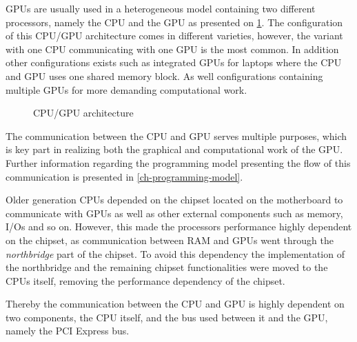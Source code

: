 GPUs are usually used in a heterogeneous model containing two different processors, namely the CPU and the GPU as presented on \cref{fig:hw-cpu-gpu}.
The configuration of this CPU/GPU architecture comes in different varieties, however, the variant with one CPU communicating with one GPU is the most common.
In addition other configurations exists such as integrated GPUs for laptops where the CPU and GPU uses one shared memory block.
As well configurations containing multiple GPUs for more demanding computational work.

\begin{figure}[ht]
	\centering
	\caption{CPU/GPU architecture}
	\label{fig:hw-cpu-gpu}
\end{figure}

The communication between the CPU and GPU serves multiple purposes, which is key part in realizing both the graphical and computational work of the GPU.
Further information regarding the programming model presenting the flow of this communication is presented in \cref{ch-programming-model}.

Older generation CPUs depended on the chipset located on the motherboard to communicate with GPUs as well as other external components such as memory, I/Os and so on.
However, this made the processors performance highly dependent on the chipset, as communication between RAM and GPUs went through the \textit{northbridge} part of the chipset.
To avoid this dependency the implementation of the northbridge and the remaining chipset functionalities were moved to the CPUs itself, removing the performance dependency of the chipset.

Thereby the communication between the CPU and GPU is highly dependent on two components, the CPU itself, and the bus used between it and the GPU, namely the PCI Express bus.